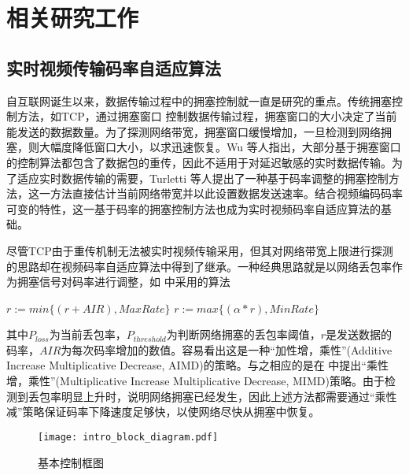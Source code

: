 \chapter{相关研究工作}
\label{chap:related}

\section{实时视频传输码率自适应算法}
自互联网诞生以来，数据传输过程中的拥塞控制就一直是研究的重点。传统拥塞控制方法，如TCP，通过拥塞窗口 \cite{jacobson1988congestion} 控制数据传输过程，拥塞窗口的大小决定了当前能发送的数据数量。为了探测网络带宽，拥塞窗口缓慢增加，一旦检测到网络拥塞，则大幅度降低窗口大小，以求迅速恢复。Wu \cite{wu2000end}等人指出，大部分基于拥塞窗口的控制算法都包含了数据包的重传，因此不适用于对延迟敏感的实时数据传输。为了适应实时数据传输的需要，Turletti \cite{turletti1996videoconferencing} 等人提出了一种基于码率调整的拥塞控制方法，这一方法直接估计当前网络带宽并以此设置数据发送速率。结合视频编码码率可变的特性，这一基于码率的拥塞控制方法也成为实时视频码率自适应算法的基础。

尽管TCP由于重传机制无法被实时视频传输采用，但其对网络带宽上限进行探测的思路却在视频码率自适应算法中得到了继承。一种经典思路就是以网络丢包率作为拥塞信号对码率进行调整，如 \cite{wu2000end} 中采用的算法
\begin{algorithmic}
    \State $r := min\{(r+AIR), MaxRate \} $
\Else
    \State $r := max\{(\alpha * r), MinRate \} $
\EndIf
\end{algorithmic}
其中$P_{loss}$为当前丢包率，$P_{threshold}$为判断网络拥塞的丢包率阈值，$r$是发送数据的码率，$AIR$为每次码率增加的数值。容易看出这是一种``加性增，乘性''(Additive Increase Multiplicative Decrease, AIMD)的策略。与之相应的是在 \cite{turletti1996videoconferencing} 中提出``乘性增，乘性''(Multiplicative Increase Multiplicative Decrease, MIMD)策略。由于检测到丢包率明显上升时，说明网络拥塞已经发生，因此上述方法都需要通过``乘性减''策略保证码率下降速度足够快，以使网络尽快从拥塞中恢复。

\begin{figure}[htbp]
  \centering
  \texttt{[image: intro\_block\_diagram.pdf]}
  \caption{基本控制框图}
  \label{fig:intro_block_diagram}
\end{figure}


